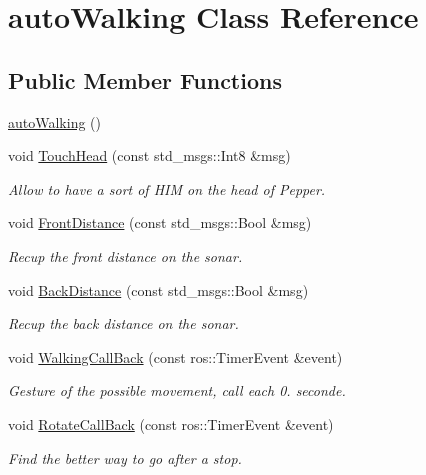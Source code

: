 \hypertarget{classauto_walking}{}\section{auto\+Walking Class Reference}
\label{classauto_walking}
\subsection*{Public Member Functions}
\begin{DoxyCompactItemize}
\item 
\hyperlink{classauto_walking_a6b81e2c604bbcf24bd34b5ddf7ea8270}{auto\+Walking} ()
\item 
void \hyperlink{classauto_walking_ae0f17930f80f5bf8e11bc246240b75a2}{Touch\+Head} (const std\+\_\+msgs\+::\+Int8 \&msg)
\begin{DoxyCompactList}\small\item\em Allow to have a sort of H\+IM on the head of Pepper. \end{DoxyCompactList}\item 
void \hyperlink{classauto_walking_a01b4702802806fc58ed344c226576535}{Front\+Distance} (const std\+\_\+msgs\+::\+Bool \&msg)
\begin{DoxyCompactList}\small\item\em Recup the front distance on the sonar. \end{DoxyCompactList}\item 
void \hyperlink{classauto_walking_a78e3b78ca7050490278b96474ffebb71}{Back\+Distance} (const std\+\_\+msgs\+::\+Bool \&msg)
\begin{DoxyCompactList}\small\item\em Recup the back distance on the sonar. \end{DoxyCompactList}\item 
void \hyperlink{classauto_walking_a383e14e4397ffeda34d43f9ebe94f52d}{Walking\+Call\+Back} (const ros\+::\+Timer\+Event \&event)
\begin{DoxyCompactList}\small\item\em Gesture of the possible movement, call each 0. seconde. \end{DoxyCompactList}\item 
void \hyperlink{classauto_walking_a38c0927b35e47c93d1d06ce57919f2e8}{Rotate\+Call\+Back} (const ros\+::\+Timer\+Event \&event)
\begin{DoxyCompactList}\small\item\em Find the better way to go after a stop. \end{DoxyCompactList}\item 

\end{DoxyCompactItemize}
